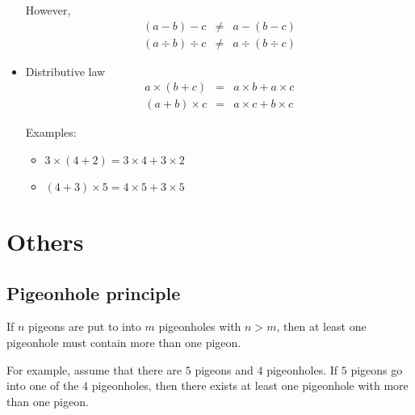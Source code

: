 \documentclass[12pt]{article}   	%
\begin{document}
\begin{itemize}
However, 
\begin{eqnarray*}
(a - b) - c  &\neq&  a - (b - c)
\\
(a \div b) \div c  &\neq&  a \div (b \div c)
\end{eqnarray*}

\item Distributive law
\begin{eqnarray*}
a \times (b + c)  &=& a \times b + a \times c
\\
(a + b) \times c  &=&  a \times c + b \times c
\end{eqnarray*}

Examples:
\begin{itemize}
    \item $3 \times (4 + 2)  = 3 \times 4 + 3 \times 2$
    \item $(4 + 3) \times 5  =  4 \times 5 + 3 \times 5$
\end{itemize}

\end{itemize}


\section{Others}

\subsection{Pigeonhole principle}

If $n$ pigeons are put to into $m$ pigeonholes with $n>m$,
then at least one pigeonhole must contain more than one pigeon.

For example, assume that there are $5$ pigeons and $4$ pigeonholes.
If $5$ pigeons go into one of the $4$ pigeonholes,
then there exists at least one pigeonhole with more than one pigeon.
\end{document}
